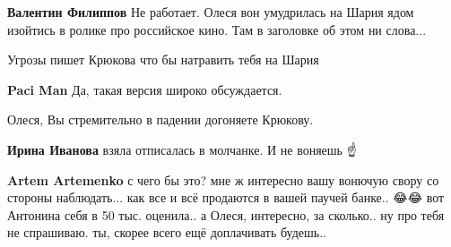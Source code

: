 \begin{itemize}
\begin{itemize}
\textbf{Валентин Филиппов} Не работает. Олеся вон умудрилась на Шария ядом
изойтись в ролике про российское кино. Там в заголовке об этом ни слова...
\end{itemize}

 
Угрозы пишет Крюкова что бы натравить тебя на Шария

\begin{itemize}
 
\textbf{Paci Man} Да, такая версия широко обсуждается.
\end{itemize}

 
Олеся, Вы стремительно в падении догоняете Крюкову.

\begin{itemize}
 
\textbf{Ирина Иванова} взяла отписалась в молчанке.
И не воняешь ☝

 
\textbf{Artem Artemenko} с чего бы это? мне ж интересно вашу вонючую свору со стороны наблюдать... как все и всё продаются в вашей паучей банке.. 😂😂 вот Антонина себя в 50 тыс. оценила.. а Олеся, интересно, за сколько.. ну про тебя не спрашиваю. ты, скорее всего ещё доплачивать будешь..


\end{itemize}
\end{itemize}
